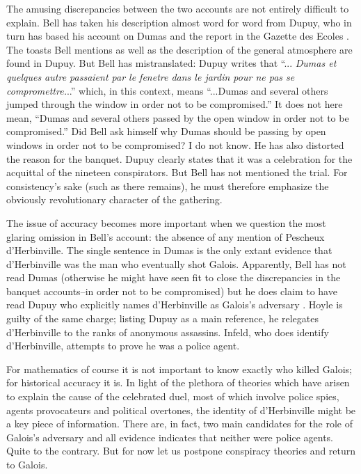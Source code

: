 \documentclass[12pt]{article}
\begin{document}
The amusing discrepancies between the two accounts are not entirely difficult to explain. Bell has taken his description almost word for word from Dupuy, who in turn has based his account on Dumas and the report in the Gazette des Ecoles \cite{51}. The toasts Bell mentions as well as the description of the general atmosphere are found in Dupuy. But Bell has mistranslated: Dupuy writes that ``... \emph{Dumas et quelques autre passaient par le fenetre dans le jardin pour ne pas se compromettre.}..'' \cite{52} which, in this context, means ``...Dumas and several others jumped through the window in order not to be compromised.'' It does not here mean, ``Dumas and several others passed by the open window in order not to be compromised.'' Did Bell ask himself why Dumas should be passing by open windows in order not to be compromised? I do not know. He has also distorted the reason for the banquet. Dupuy clearly states \cite{53} that it was a celebration for the acquittal of the nineteen conspirators. But Bell has not mentioned the trial. For consistency's sake (such as there remains), he must therefore emphasize the obviously revolutionary character of the gathering.

The issue of accuracy becomes more important when we question the most glaring omission in Bell's account: the absence of any mention of Pescheux d'Herbinville. The single sentence in Dumas is the only extant evidence that d'Herbinville was the man who eventually shot Galois. Apparently, Bell has not read Dumas (otherwise he might have seen fit to close the discrepancies in the banquet accounts--in order not to be compromised) but he does claim to have read Dupuy who explicitly names d'Herbinville as Galois's adversary \cite{54}. Hoyle is guilty of the same charge; listing Dupuy as a main reference, he relegates d'Herbinville to the ranks of anonymous assassins. Infeld, who does identify d'Herbinville, attempts to prove he was a police agent.

For mathematics of course it is not important to know exactly who killed Galois; for historical accuracy it is. In light of the plethora of theories which have arisen to explain the cause of the celebrated duel, most of which involve police spies, agents provocateurs and political overtones, the identity of d'Herbinville might be a key piece of information. There are, in fact, two main candidates for the role of Galois's adversary and all evidence indicates that neither were police agents. Quite to the contrary. But for now let us postpone conspiracy theories and return to Galois.
\end{document}
